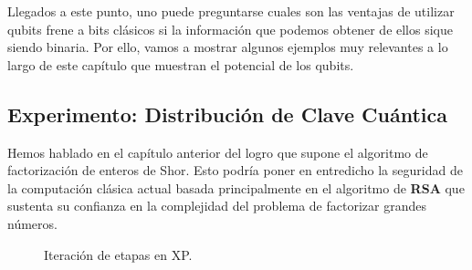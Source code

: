 Llegados a este punto, uno puede preguntarse cuales son las ventajas de utilizar qubits frene a bits clásicos si la información que podemos obtener de ellos sique siendo binaria. Por ello, vamos a mostrar algunos ejemplos muy relevantes a lo largo de este capítulo que muestran el potencial de los qubits.

\subsection{Experimento: Distribución de Clave Cuántica}

Hemos hablado en el capítulo anterior del logro que supone el algoritmo de factorización de enteros de Shor. Esto podría poner en entredicho la seguridad de la computación clásica actual basada principalmente en el algoritmo de \textbf{RSA} que sustenta su confianza en la complejidad del problema de factorizar grandes números.

\begin{figure}[!htb]
\begin{center}
\end{center}
\caption{Iteración de etapas en XP.}
\label{fig:fig21}

\end{figure}